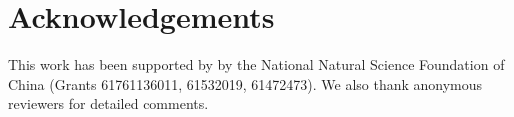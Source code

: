 \vspace{-1.8em}
\section{Acknowledgements}
\vspace{-1em}

This work has been supported by by the National Natural Science Foundation of
China (Grants 61761136011, 61532019, 61472473).
We also thank anonymous reviewers for detailed comments.

